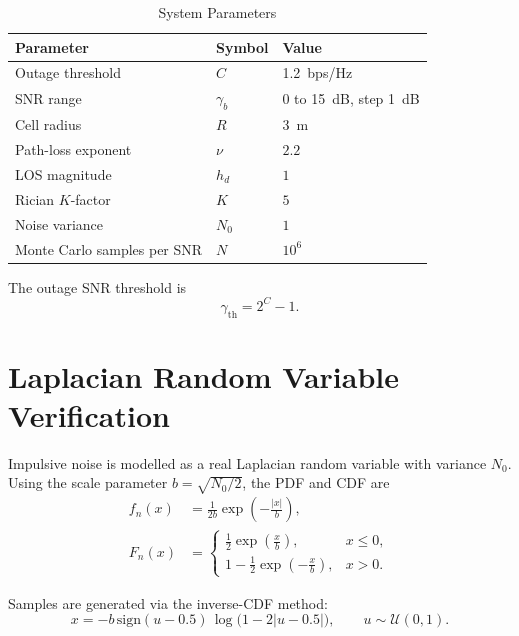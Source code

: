 \documentclass[12pt,a4paper]{article}
\begin{document}
\begin{table}[H]
\centering
\caption{System Parameters}
\label{tab:parameters}
\begin{tabular}{lll}
\toprule
\textbf{Parameter} & \textbf{Symbol} & \textbf{Value} \\
\midrule
Outage threshold & $C$ & \SI{1.2}{bps/Hz} \\
SNR range & $\gamma_b$ & $0$ to \SI{15}{dB}, step \SI{1}{dB} \\
Cell radius & $R$ & \SI{3}{m} \\
Path-loss exponent & $\nu$ & $2.2$ \\
LOS magnitude & $h_d$ & $1$ \\
Rician $K$-factor & $K$ & $5$ \\
Noise variance & $N_0$ & $1$ \\
Monte Carlo samples per SNR & $N$ & $10^6$ \\
\bottomrule
\end{tabular}
\end{table}

The outage SNR threshold is
\begin{equation}
    \gamma_{\text{th}} = 2^C - 1.
\end{equation}

\section{Laplacian Random Variable Verification}\label{sec:laplace}
Impulsive noise is modelled as a real Laplacian random variable with variance $N_0$. Using the scale parameter $b=\sqrt{N_0/2}$, the PDF and CDF are
\begin{align}
    f_n(x) &= \frac{1}{2b}\exp\!\left(-\frac{|x|}{b}\right), \\
    F_n(x) &=
    \begin{cases}
        \frac{1}{2}\exp\!\left(\frac{x}{b}\right), & x \le 0, \\[0.5em]
        1 - \frac{1}{2}\exp\!\left(-\frac{x}{b}\right), & x > 0.
    \end{cases}
\end{align}

Samples are generated via the inverse-CDF method:
\begin{equation}
    x = -b\,\text{sign}(u-0.5)\,\log\bigl(1 - 2|u-0.5|\bigr), \qquad u \sim \mathcal{U}(0,1).
\end{equation}
\end{document}

